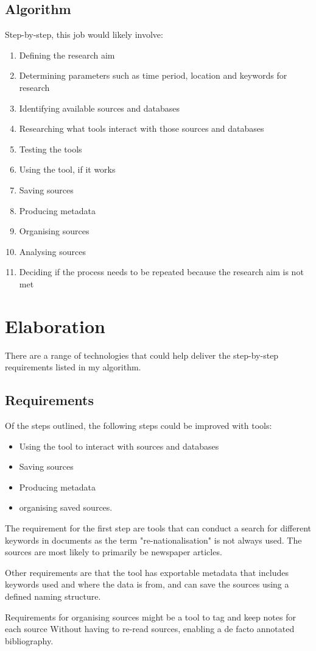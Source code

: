 \documentclass{article}
\begin{document}
\subsection*{Algorithm}
Step-by-step, this job would likely involve:
\begin{enumerate}
\item Defining the research aim
\item Determining parameters such as time period, location and keywords for research
\item Identifying available sources and databases
\item Researching what tools interact with those sources and databases
\item Testing the tools
\item Using the tool, if it works
\item Saving sources
\item Producing metadata
\item Organising sources
\item Analysing sources
\item Deciding if the process needs to be repeated because the research aim is not met
\end{enumerate}

\section*{Elaboration}

There are a range of technologies that could help deliver the step-by-step requirements listed in my algorithm.

\subsection*{Requirements}

Of the steps outlined, the following steps could be improved with tools:
\begin{itemize}
\item Using the tool to interact with sources and databases
\item Saving sources
\item Producing metadata
\item organising saved sources.
\end{itemize}\par

The requirement for the first step are tools that can conduct a search for different keywords in documents as the term "re-nationalisation" is not always used. The sources are most likely to primarily be newspaper articles.\par
Other requirements are that the tool has exportable metadata that includes keywords used and where the data is from, and can save the sources using a defined naming structure.
\par
Requirements for organising sources might be a tool to tag and keep notes for each source Without having to re-read sources, enabling a de facto annotated bibliography.
\par
\end{document}
